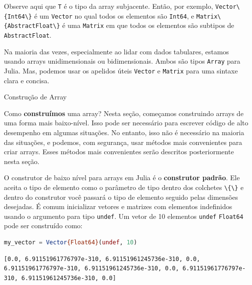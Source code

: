 \documentclass[
  notoc %
]{tufte-book}
\makeatletter
\newcommand{\passthrough}[1]{#1}
\renewcommand\subsubsection{%
\@startsection{subsubsection}{3}{\z@ }{-3.25ex\@plus -1ex \@minus -.2ex}{1.5ex \@plus .2ex}{\normalfont \normalsize \bfseries }
}
\makeatother
\begin{document}
Observe aqui que \passthrough{\lstinline!T!} é o tipo da array
subjacente. Então, por exemplo,
\passthrough{\lstinline!Vector\{Int64\}!} é um
\passthrough{\lstinline!Vector!} no qual todos os elementos são
\passthrough{\lstinline!Int64!}, e
\passthrough{\lstinline!Matrix\{AbstractFloat\}!} é uma
\passthrough{\lstinline!Matrix!} em que todos os elementos são subtipos
de \passthrough{\lstinline!AbstractFloat!}.

Na maioria das vezes, especialmente ao lidar com dados tabulares,
estamos usando arrays unidimensionais ou bidimensionais. Ambos são tipos
\passthrough{\lstinline!Array!} para Julia. Mas, podemos usar os
apelidos úteis \passthrough{\lstinline!Vector!} e
\passthrough{\lstinline!Matrix!} para uma sintaxe clara e concisa.

\hypertarget{sec:array_construction}{%
\subsubsection{Construção de Array}\label{sec:array_construction}}

Como \textbf{construímos} uma array? Nesta seção, começamos construindo
arrays de uma forma mais baixo-nível. Isso pode ser necessário para
escrever código de alto desempenho em algumas situações. No entanto,
isso não é necessário na maioria das situações, e podemos, com
segurança, usar métodos mais convenientes para criar arrays. Esses
métodos mais convenientes serão descritos posteriormente nesta seção.

O construtor de baixo nível para arrays em Julia é o \textbf{construtor
padrão}. Ele aceita o tipo de elemento como o parâmetro de tipo dentro
dos colchetes \passthrough{\lstinline!\{\}!} e dentro do construtor você
passará o tipo de elemento seguido pelas dimensões desejadas. É comum
inicializar vetores e matrizes com elementos indefinidos usando o
argumento para tipo \passthrough{\lstinline!undef!}. Um vetor de 10
elementos \passthrough{\lstinline!undef!}
\passthrough{\lstinline!Float64!} pode ser construído como:

\begin{lstlisting}[language=Julia]
my_vector = Vector{Float64}(undef, 10)
\end{lstlisting}

\begin{lstlisting}[language=Output]
[0.0, 6.91151961776797e-310, 6.91151961245736e-310, 0.0, 6.91151961776797e-310, 6.91151961245736e-310, 0.0, 6.91151961776797e-310, 6.91151961245736e-310, 0.0]
\end{lstlisting}
\end{document}
